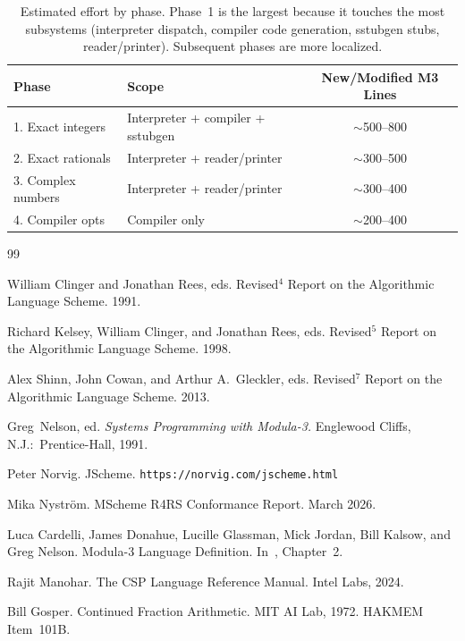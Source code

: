 \documentclass[12pt]{report}
\begin{document}
\begin{table}[htbp]
\centering
\begin{tabular}{llc}
\toprule
\textbf{Phase} & \textbf{Scope} & \textbf{New/Modified M3 Lines} \\
\midrule
1. Exact integers   & Interpreter + compiler + sstubgen & $\sim$500--800 \\
2. Exact rationals  & Interpreter + reader/printer      & $\sim$300--500 \\
3. Complex numbers  & Interpreter + reader/printer      & $\sim$300--400 \\
4. Compiler opts    & Compiler only                     & $\sim$200--400 \\
\bottomrule
\end{tabular}
\caption{Estimated effort by phase.  Phase~1 is the largest because
  it touches the most subsystems (interpreter dispatch, compiler code
  generation, sstubgen stubs, reader/printer).  Subsequent phases are
  more localized.}
\label{tab:effort}
\end{table}

\begin{thebibliography}{99}

 William Clinger and Jonathan Rees, eds.
Revised$^4$ Report on the Algorithmic Language Scheme.  1991.

 Richard Kelsey, William Clinger, and Jonathan Rees, eds.
Revised$^5$ Report on the Algorithmic Language Scheme.  1998.

 Alex Shinn, John Cowan, and Arthur A.\ Gleckler, eds.
Revised$^7$ Report on the Algorithmic Language Scheme.  2013.

 Greg~Nelson, ed.  {\it Systems Programming with Modula-3.}
Englewood Cliffs, N.J.:\ Prentice-Hall, 1991.

 Peter Norvig.  JScheme.
{\tt https://norvig.com/jscheme.html}

 Mika Nystr\"om.  MScheme R4RS Conformance Report.
March 2026.

 Luca Cardelli, James Donahue, Lucille Glassman,
Mick Jordan, Bill Kalsow, and Greg Nelson.
Modula-3 Language Definition.
In~\cite{spwm3}, Chapter~2.

 Rajit Manohar.
The CSP Language Reference Manual.
Intel Labs, 2024.

 Bill Gosper.  Continued Fraction Arithmetic.
MIT AI Lab, 1972.  HAKMEM Item~101B.

\end{thebibliography}
\end{document}

